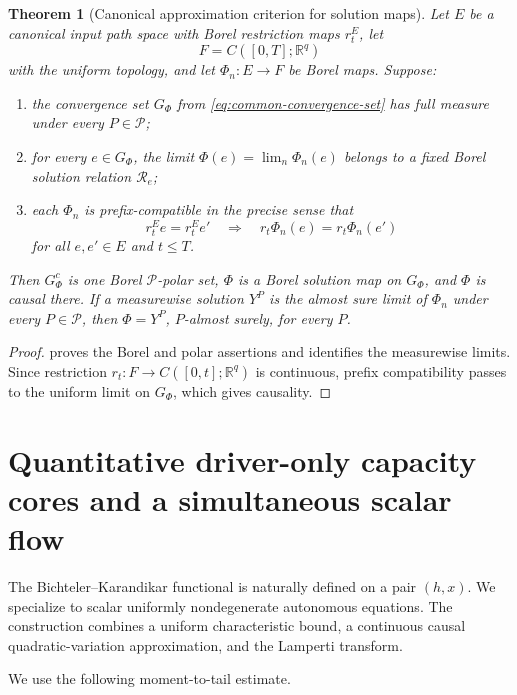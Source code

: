 \documentclass[11pt,reqno]{amsart}
\theoremstyle{plain}
\newtheorem{theorem}{Theorem}[section]
\theoremstyle{definition}
\newcommand{\R}{\mathbb R}
\newcommand{\cP}{\mathcal P}
\newcommand{\cR}{\mathcal R}
\begin{document}
\begin{theorem}[Canonical approximation criterion for solution maps]
\label{thm:canonical-solution-approx}
Let \(E\) be a canonical input path space with Borel restriction maps
\(r_t^E\), let
\[
  F=C([0,T];\R^q)
\]
with the uniform topology, and let \(\Phi_n:E\to F\) be Borel maps.  Suppose:
\begin{enumerate}[label=(\roman*),leftmargin=2.2em]
  \item the convergence set \(G_\Phi\) from
  \eqref{eq:common-convergence-set} has full measure under every
  \(P\in\cP\);
  \item for every \(e\in G_\Phi\), the limit
  \(\Phi(e)=\lim_n\Phi_n(e)\) belongs to a fixed Borel solution relation
  \(\cR_e\);
  \item each \(\Phi_n\) is prefix-compatible in the precise sense that
  \[
    r_t^Ee=r_t^Ee'
    \quad\Longrightarrow\quad
    r_t\Phi_n(e)=r_t\Phi_n(e')
  \]
  for all \(e,e'\in E\) and \(t\le T\).
\end{enumerate}
Then \(G_\Phi^c\) is one Borel \(\cP\)-polar set, \(\Phi\) is a Borel
solution map on \(G_\Phi\), and \(\Phi\) is causal there.  If a measurewise
solution \(Y^P\) is the almost sure limit of \(\Phi_n\) under every
\(P\in\cP\), then \(\Phi=Y^P\), \(P\)-almost surely, for every \(P\).
\end{theorem}

\begin{proof}
 proves the Borel and polar assertions and identifies
the measurewise limits.  Since restriction
\(r_t:F\to C([0,t];\R^q)\) is continuous, prefix compatibility passes to the
uniform limit on \(G_\Phi\), which gives causality.
\end{proof}

\section{Quantitative driver-only capacity cores and a simultaneous scalar flow}
\label{sec:driver-core}

The Bichteler--Karandikar functional is naturally defined on a pair
\((h,x)\).  We specialize to scalar uniformly nondegenerate autonomous
equations.  The construction combines a uniform characteristic bound, a
continuous causal quadratic-variation approximation, and the Lamperti
transform.

We use the following moment-to-tail estimate.
\end{document}
